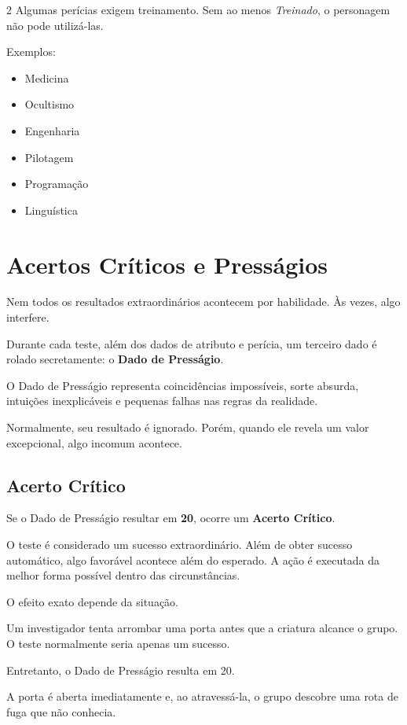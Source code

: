 \documentclass[a4paper,11pt,openany]{book}
\begin{document}
\begin{multicols}{2}
Algumas perícias exigem treinamento. Sem ao menos \textit{Treinado}, o personagem não pode utilizá-las.

Exemplos:
\begin{itemize}
\item Medicina
\item Ocultismo
\item Engenharia
\item Pilotagem
\item Programação
\item Linguística
\end{itemize}

\section{Acertos Críticos e Presságios}

Nem todos os resultados extraordinários acontecem por habilidade. Às vezes, algo interfere.

Durante cada teste, além dos dados de atributo e perícia, um terceiro dado é rolado secretamente: o \textbf{Dado de Presságio}.

O Dado de Presságio representa coincidências impossíveis, sorte absurda, intuições inexplicáveis e pequenas falhas nas regras da realidade.

Normalmente, seu resultado é ignorado. Porém, quando ele revela um valor excepcional, algo incomum acontece.

\subsection{Acerto Crítico}

Se o Dado de Presságio resultar em \textbf{20}, ocorre um \textbf{Acerto Crítico}.

O teste é considerado um sucesso extraordinário. Além de obter sucesso automático, algo favorável acontece além do esperado. A ação é executada da melhor forma possível dentro das circunstâncias.

O efeito exato depende da situação.

\begin{exemplo}
Um investigador tenta arrombar uma porta antes que a criatura alcance o grupo. O teste normalmente seria apenas um sucesso.

Entretanto, o Dado de Presságio resulta em 20.

A porta é aberta imediatamente e, ao atravessá-la, o grupo descobre uma rota de fuga que não conhecia.
\end{exemplo}


\end{multicols}
\end{document}
